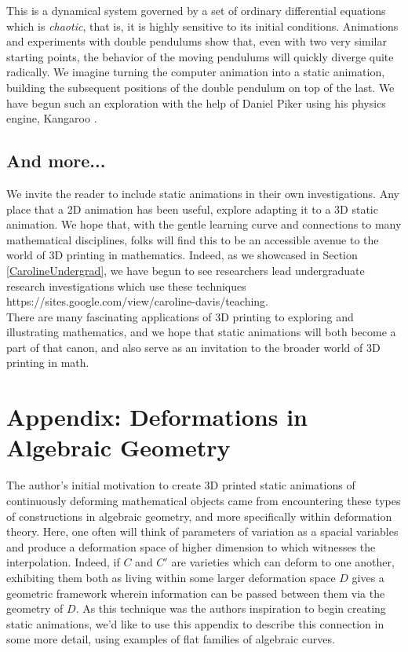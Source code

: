 \documentclass[12 pt]{article}
\begin{document}
This is a dynamical system governed by a set of ordinary differential equations which is \textit{chaotic}, that is, it is highly sensitive to its initial conditions.  Animations and experiments with double pendulums show that, even with two very similar starting points, the behavior of the moving pendulums will quickly diverge quite radically.  We imagine turning the computer animation into a static animation, building the subsequent positions of the double pendulum on top of the last.  We have begun such an exploration with the help of Daniel Piker using his physics engine, Kangaroo \cite{kangaroo}.
\subsection{And more...}
We invite the reader to include static animations in their own investigations.   Any place that a 2D animation has been useful, explore adapting it to a 3D static animation.  We hope that, with the gentle learning curve and connections to many mathematical disciplines, folks will find this to be an accessible avenue to the world of 3D printing in mathematics.  Indeed, as we showcased in Section \ref{CarolineUndergrad}, we have begun to see researchers lead undergraduate research investigations which use these techniques https://sites.google.com/view/caroline-davis/teaching.\\

There are many fascinating applications of 3D printing to exploring and illustrating mathematics, and we hope that static animations will both become a part of that canon, and also serve as an invitation to the broader world of 3D printing in math.

{}


\appendix
\section*{Appendix: Deformations in Algebraic Geometry}
The author's initial motivation to create 3D printed static animations of continuously deforming mathematical objects came from encountering these types of constructions in algebraic geometry, and more specifically within deformation theory.  Here, one often will think of parameters of variation as a spacial variables and produce a deformation space of higher dimension to which witnesses the interpolation.  Indeed, if $C$ and $C'$ are varieties which can deform to one another, exhibiting them both as living within some larger deformation space $D$ gives a geometric framework wherein information can be passed between them via the geometry of $D$.  As this technique was the authors inspiration to begin creating static animations, we'd like to use this appendix to describe this connection in some more detail, using examples of flat families of algebraic curves.\\
\end{document}
